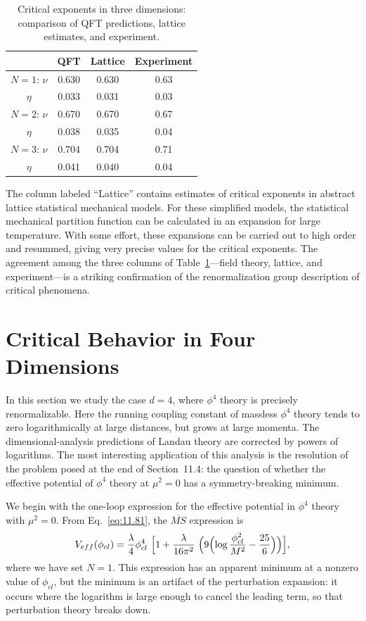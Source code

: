 \begin{table}[t]
  \centering
  \caption{Critical exponents in three dimensions: comparison of QFT
    predictions, lattice estimates, and experiment.}
  \begin{tabular}{cccc}
    \toprule
    & QFT & Lattice & Experiment\\
    \midrule
    $N=1$: $\nu$ & 0.630 & 0.630 & 0.63\\
    \quad $\eta$ & 0.033 & 0.031 & 0.03\\
    $N=2$: $\nu$ & 0.670 & 0.670 & 0.67\\
    \quad $\eta$ & 0.038 & 0.035 & 0.04\\
    $N=3$: $\nu$ & 0.704 & 0.704 & 0.71\\
    \quad $\eta$ & 0.041 & 0.040 & 0.04\\
    \bottomrule
  \end{tabular}
  \label{tab:13.1}
\end{table}

The column labeled ``Lattice'' contains estimates of critical exponents in
abstract lattice statistical mechanical models.  For these simplified models,
the statistical mechanical partition function can be calculated in an
expansion for large temperature.  With some effort, these expansions can be
carried out to high order and resummed, giving very precise values for the
critical exponents.  The agreement among the three columns of
Table~\ref{tab:13.1}---field theory, lattice, and experiment---is a striking
confirmation of the renormalization group description of critical phenomena.

\section{Critical Behavior in Four Dimensions}

In this section we study the case $d = 4$, where $\phi^4$ theory is precisely
renormalizable.  Here the running coupling constant of massless $\phi^4$
theory tends to zero logarithmically at large distances, but grows at large
momenta.  The dimensional-analysis predictions of Landau theory are corrected
by powers of logarithms.  The most interesting application of this analysis
is the resolution of the problem posed at the end of Section~11.4: the
question of whether the effective potential of $\phi^4$ theory at $\mu^2 = 0$
has a symmetry-breaking minimum.

We begin with the one-loop expression for the effective potential in
$\phi^4$ theory with $\mu^2 = 0$.  From Eq.~\eqref{eq:11.81}, the
$\overline{MS}$ expression is
\begin{equation}
  V_{eff}(\phi_{cl}) = \frac{\lambda}{4}\phi_{cl}^4\ \Bigl[ 1 +
    \frac{\lambda}{16\pi^2}\ \Bigl( 9\Bigl( \log\frac{\phi_{cl}^2}{M^2}
      - \frac{25}{6} \Bigr) \Bigr) \Bigr] ,
  \label{eq:13.55}
\end{equation}
where we have set $N = 1$.  This expression has an apparent minimum at a
nonzero value of $\phi_{cl}$, but the minimum is an artifact of the
perturbation expansion: it occurs where the logarithm is large enough to
cancel the leading term, so that perturbation theory breaks down.

